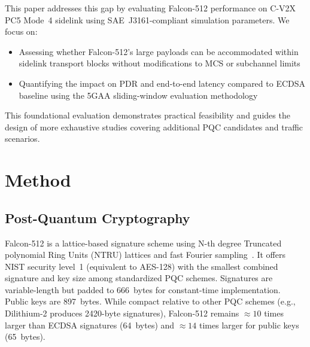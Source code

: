 \documentclass[conference]{IEEEtran}
\begin{document}
This paper addresses this gap by evaluating Falcon-512 performance on C-V2X  PC5 Mode~4 sidelink using SAE~J3161-compliant simulation parameters. We focus on:
\begin{itemize}
    \item Assessing whether Falcon-512's large payloads can be accommodated within sidelink transport blocks without modifications to MCS or subchannel limits
    \item Quantifying the impact on PDR and end-to-end latency compared to ECDSA baseline using the 5GAA sliding-window evaluation methodology~\cite{5gaa_p190033}
\end{itemize}

This foundational evaluation demonstrates practical feasibility and guides the design of more exhaustive studies covering additional PQC candidates and traffic scenarios.






\section{Method}

\subsection{Post-Quantum Cryptography}

Falcon-512 is a lattice-based signature scheme using N-th degree Truncated polynomial Ring Units (NTRU) lattices and fast Fourier sampling~\cite{fips206}. It offers NIST security level~1 (equivalent to AES-128) with the smallest combined signature and key size among standardized PQC schemes. Signatures are variable-length but padded to 666~bytes for constant-time implementation. Public keys are 897~bytes. While compact relative to other PQC schemes (e.g., Dilithium-2 produces 2420-byte signatures), Falcon-512 remains $\approx 10$ times larger than ECDSA signatures (64~bytes) and $\approx 14$ times larger for public keys (65~bytes).
\end{document}
